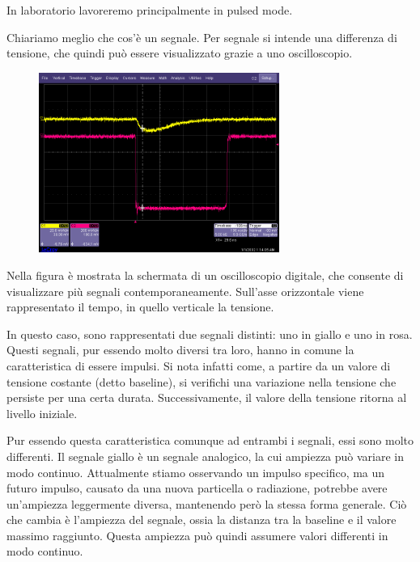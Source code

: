 In laboratorio lavoreremo principalmente in pulsed mode.

Chiariamo meglio che cos'è un segnale. Per segnale si intende una differenza di tensione, che quindi può essere visualizzato grazie a uno oscilloscopio.

\begin{figure}[H]
   \centering
   \includegraphics[width=0.7\textwidth]{immagini/segnali_rivelatori.png}
\end{figure}

Nella figura è mostrata la schermata di un oscilloscopio digitale, che consente di visualizzare più segnali contemporaneamente. Sull'asse orizzontale viene rappresentato il tempo, in quello verticale la tensione.

In questo caso, sono rappresentati due segnali distinti: uno in giallo e uno in rosa. Questi segnali, pur essendo molto diversi tra loro, hanno in comune la caratteristica di essere impulsi. Si nota infatti come, a partire da un valore di tensione costante (detto baseline), si verifichi una variazione nella tensione che persiste per una certa durata. Successivamente, il valore della tensione ritorna al livello iniziale.

Pur essendo questa caratteristica comunque ad entrambi i segnali, essi sono molto differenti. Il segnale giallo è un segnale analogico, la cui ampiezza può variare in modo continuo. Attualmente stiamo osservando un impulso specifico, ma un futuro impulso, causato da una nuova particella o radiazione, potrebbe avere un'ampiezza leggermente diversa, mantenendo però la stessa forma generale. Ciò che cambia è l'ampiezza del segnale, ossia la distanza tra la baseline e il valore massimo raggiunto. Questa ampiezza può quindi assumere valori differenti in modo continuo.

